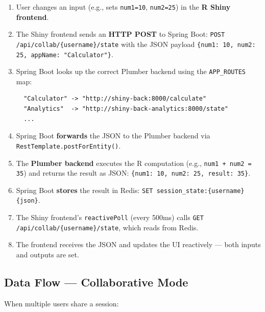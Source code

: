 \documentclass[12pt,a4paper]{article}
\begin{document}
\begin{enumerate}[nosep]
  \item User changes an input (e.g., sets \texttt{num1=10}, \texttt{num2=25}) in the \textbf{R Shiny frontend}.
  \item The Shiny frontend sends an \textbf{HTTP POST} to Spring Boot: \texttt{POST /api/collab/\{username\}/state} with the JSON payload \texttt{\{num1: 10, num2: 25, appName: "Calculator"\}}.
  \item Spring Boot looks up the correct Plumber backend using the \texttt{APP\_ROUTES} map:
  \begin{verbatim}
  "Calculator" -> "http://shiny-back:8000/calculate"
  "Analytics"  -> "http://shiny-back-analytics:8000/state"
  ...
  \end{verbatim}
  \item Spring Boot \textbf{forwards} the JSON to the Plumber backend via \texttt{RestTemplate.postForEntity()}.
  \item The \textbf{Plumber backend} executes the R computation (e.g., \texttt{num1 + num2 = 35}) and returns the result as JSON: \texttt{\{num1: 10, num2: 25, result: 35\}}.
  \item Spring Boot \textbf{stores} the result in Redis: \texttt{SET session\_state:\{username\} \{json\}}.
  \item The Shiny frontend's \texttt{reactivePoll} (every 500ms) calls \texttt{GET /api/collab/\{username\}/state}, which reads from Redis.
  \item The frontend receives the JSON and updates the UI reactively --- both inputs and outputs are set.
\end{enumerate}

\subsection{Data Flow --- Collaborative Mode}

When multiple users share a session:
\end{document}
